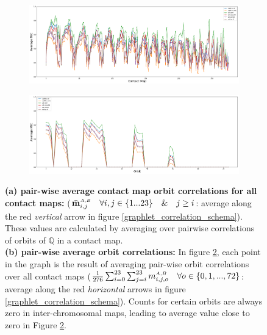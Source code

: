 \documentclass[a4,center,fleqn]{NAR}
\begin{document}
\begin{figure}
    \centering
    \begin{subfigure}[b]{.5\textwidth}
        \includegraphics[width=\textwidth]{figures/contact_maps_correlations_all.png}
        \caption{}
        \label{fig:contact_maps_correlations_all}
    \end{subfigure}
    \begin{subfigure}[b]{.5\textwidth}
        \includegraphics[width=\textwidth]{figures/orbits_correlations_all.png}
        \caption{
        }
        \label{fig:orbits_correlations_all}
    \end{subfigure}
    \caption{   
        \textbf{(a) pair-wise average contact map orbit correlations
         for all contact maps:}
        ($\bar{\mathbf{m}}^{\scriptscriptstyle \scriptscriptstyle A,B}_{i,j} 
        \quad \forall i,j \in \{1 ... 23\} \quad \& \quad j \ge i$:
        average along the red \textit{vertical} arrow in figure 
        \ref{graphlet_correlation_schema}).
        These values are calculated by averaging over 
        pairwise correlations of orbits of
        $\mathbb{Q}$ in a contact map.
        \vspace{.1cm} \\
        \textbf{(b) pair-wise average orbit correlations:}
        In figure \ref{fig:orbits_correlations_all}, each point
        in the graph is the result of averaging pair-wise
        orbit correlations over all contact maps
        ($\frac{1}{276}\sum_{i=0}^{23}\sum_{j=i}^{23}{
        m^{\scriptscriptstyle \scriptscriptstyle A,B}_{i,j, o}} \quad 
        \forall o \in \{0, 1, ..., 72\}$:
        average along the red \textit{horizontal} arrows in figure 
        \ref{graphlet_correlation_schema}).
        Counts for certain orbits are always zero in inter-chromosomal
        maps, leading to average value close to zero in 
        Figure \ref{fig:orbits_correlations_all}.
     }
    \label{fig:results_all}
\end{figure}
\end{document}
